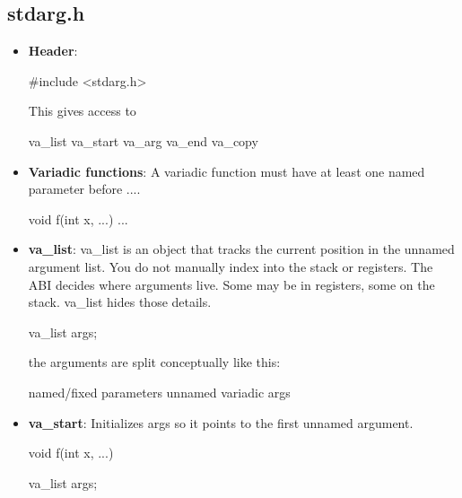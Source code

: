 \documentclass{report}
\begin{document}
        \pagebreak 
        \subsection{stdarg.h}
        \begin{itemize}
            \item \textbf{Header}:
                \bigbreak \noindent 
                \begin{cppcode}
                #include <stdarg.h>
                \end{cppcode}
                \bigbreak \noindent 
                This gives access to 
                \bigbreak \noindent 
                \begin{cppcode}
                    va_list
                    va_start
                    va_arg
                    va_end
                    va_copy
                \end{cppcode}
            \item \textbf{Variadic functions}: 
                A variadic function must have at least one named parameter before ....
                \bigbreak \noindent 
                \begin{cppcode}
                    void f(int x, ...) {...}
                \end{cppcode}
            \item \textbf{va\_list}: va\_list is an object that tracks the current position in the unnamed argument list.
                \bigbreak \noindent 
                You do not manually index into the stack or registers. The ABI decides where arguments live. Some may be in registers, some on the stack. va\_list hides those details.
                \bigbreak \noindent 
                \begin{cppcode}
                va_list args;
                \end{cppcode}
                \bigbreak \noindent 
                the arguments are split conceptually like this:
                \bigbreak \noindent 
                \begin{cppcode}
                    named/fixed parameters 
                    unnamed variadic args 
                \end{cppcode}
            \item \textbf{va\_start}: Initializes args so it points to the first unnamed argument.
                \bigbreak \noindent 
                \begin{cppcode}
                    void f(int x, ...) {
                        va_list args;

}
\end{cppcode}
\end{itemize}
\end{document}
